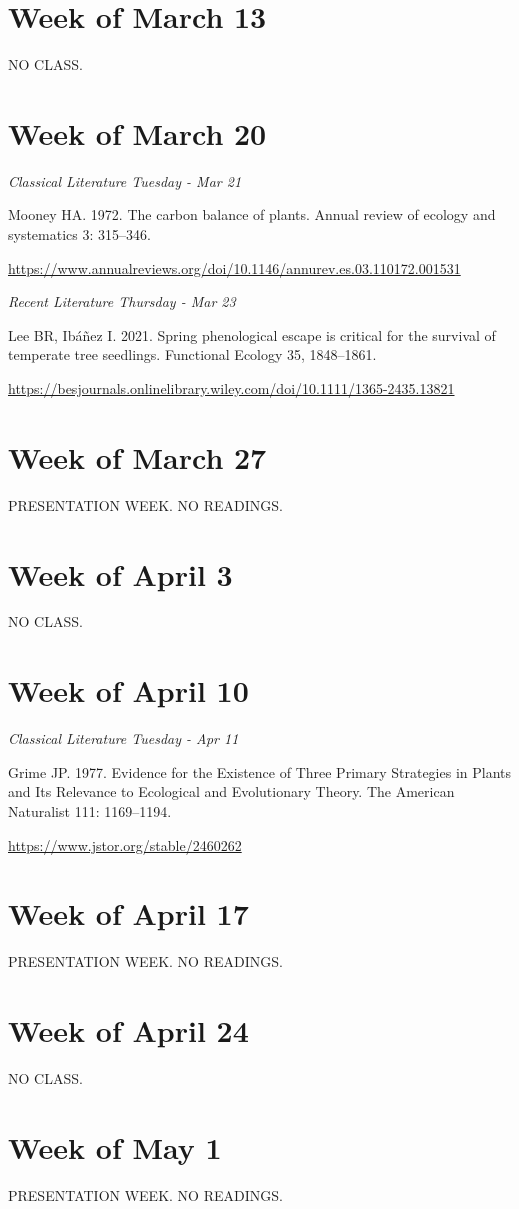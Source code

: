 \documentclass[12pt, notitlepage]{article}   	%
\begin{document}
{\section*{Week of March 13}
NO CLASS.

\section*{Week of March 20}
\textit{Classical Literature Tuesday - Mar 21} \par
Mooney HA. 1972. The carbon balance of plants. 
Annual review of ecology and systematics 3: 315–346. \par
\url{https://www.annualreviews.org/doi/10.1146/annurev.es.03.110172.001531}

\textit{Recent Literature Thursday - Mar 23} \par
Lee BR, Ibáñez I. 2021. Spring phenological escape is critical for the survival of 
temperate tree seedlings. Functional Ecology 35, 1848–1861. \par
\url{https://besjournals.onlinelibrary.wiley.com/doi/10.1111/1365-2435.13821}

\section*{Week of March 27}
PRESENTATION WEEK. NO READINGS.

\section*{Week of April 3}
NO CLASS.

\section*{Week of April 10}
\textit{Classical Literature Tuesday - Apr 11} \par
Grime JP. 1977. Evidence for the Existence of Three Primary Strategies in Plants and Its 
Relevance to Ecological and Evolutionary Theory. 
The American Naturalist 111: 1169–1194. \par
\url{https://www.jstor.org/stable/2460262}

\section*{Week of April 17}
PRESENTATION WEEK. NO READINGS.

\section*{Week of April 24}
NO CLASS.

\section*{Week of May 1}
PRESENTATION WEEK. NO READINGS.

} %
\end{document}
